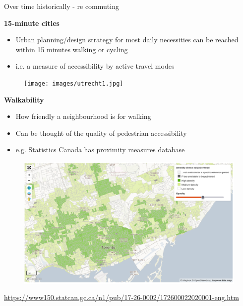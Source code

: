 \documentclass[aspectratio=169]{beamer}
\begin{document}
\begin{frame}
	
	Over time historically - re commuting
	
\end{frame}




\begin{frame}
	
	\textbf{15-minute cities}
	
	\begin{itemize}
		\item Urban planning/design strategy for most daily necessities can be reached within 15 minutes walking or cycling
		\item i.e. a measure of accessibility by active travel modes
	\end{itemize}
	
	
	
	\begin{figure}
		\centering
		\texttt{[image: images/utrecht1.jpg]}
	\end{figure}
	
\end{frame}





\begin{frame}
	
	\textbf{Walkability}
	
	\begin{itemize}
		\item How friendly a neighbourhood is for walking
		\item Can be thought of the quality of pedestrian accessibility
		\item e.g. Statistics Canada has proximity measures database
	\end{itemize}
	
	\begin{figure}
		\centering
		\includegraphics[width=0.76\linewidth]{images/pmd.png}
	\end{figure}
	
	\tiny\url{https://www150.statcan.gc.ca/n1/pub/17-26-0002/172600022020001-eng.htm}
	
	
\end{frame}
\end{document}
